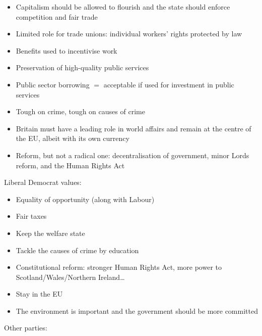 \documentclass[12pt]{article}
\begin{document}
	\begin{itemize}
		\item{Capitalism should be allowed to flourish and the state should enforce competition and fair trade}
		\item{Limited role for trade unions: individual workers' rights protected by law}
		\item{Benefits used to incentivise work}
		\item{Preservation of high-quality public services}
		\item{Public sector borrowing $=$ acceptable if used for investment in public services}
		\item{Tough on crime, tough on causes of crime}
		\item{Britain must have a leading role in world affairs and remain at the centre of the EU, albeit with its own currency}
		\item{Reform, but not a radical one: decentralisation of government, minor Lords reform, and the Human Rights Act}
	\end{itemize}

	Liberal Democrat values:

	\begin{itemize}
		\item{Equality of opportunity (along with Labour)}
		\item{Fair taxes}
		\item{Keep the welfare state}
		\item{Tackle the causes of crime by education}
		\item{Constitutional reform: stronger Human Rights Act, more power to Scotland\slash Wales\slash Northern Ireland\ldots}
		\item{Stay in the EU}
		\item{The environment is important and the government should be more committed}
	\end{itemize}

	Other parties:
\end{document}
